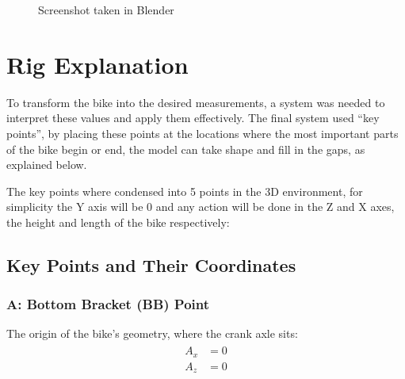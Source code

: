 \documentclass[letterpaper,10pt,english]{jupyterBook}
\begin{document}
\begin{figure}[htbp]
\centering
\capstart

\noindent{}
\caption{Screenshot taken in Blender}\label{\detokenize{Making the Model:model}}\end{figure}

\sphinxstepscope


\section{Rig Explanation}
\label{\detokenize{Setting the Rig:rig-explanation}}\label{\detokenize{Setting the Rig::doc}}
\sphinxAtStartPar
To transform the bike into the desired measurements, a system was needed to interpret these values and apply them effectively. The final system used “key points”, by placing these points at the locations where the most important parts of the bike begin or end, the model can take shape and fill in the gaps, as explained below.

\sphinxAtStartPar
The key points where condensed into 5 points in the 3D environment, for simplicity the Y axis will be 0 and any action will be done in the Z and X axes, the height and length of the bike respectively:


\subsection{Key Points and Their Coordinates}
\label{\detokenize{Setting the Rig:key-points-and-their-coordinates}}

\subsubsection{A: Bottom Bracket (BB) Point}
\label{\detokenize{Setting the Rig:a-bottom-bracket-bb-point}}
\sphinxAtStartPar
The origin of the bike’s geometry, where the crank axle sits:
\begin{equation*}
\begin{split}
\begin{aligned}
A_x &= 0 \\
A_z &= 0
\end{aligned}
\end{split}
\end{equation*}
\end{document}
